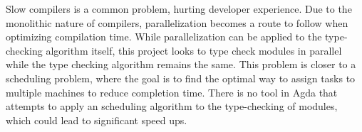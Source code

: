 Slow compilers is a common problem, hurting developer experience. Due to the
monolithic nature of compilers, parallelization becomes a route to follow when
optimizing compilation time. While parallelization can be applied to the
type-checking algorithm itself, this project looks to type check modules in
parallel while the type checking algorithm remains the same. This problem is
closer to a scheduling problem, where the goal is to find the optimal way to
assign tasks to multiple machines to reduce completion time. There is no tool
in Agda that attempts to apply an scheduling algorithm to the type-checking of
modules, which could lead to significant speed ups.  




